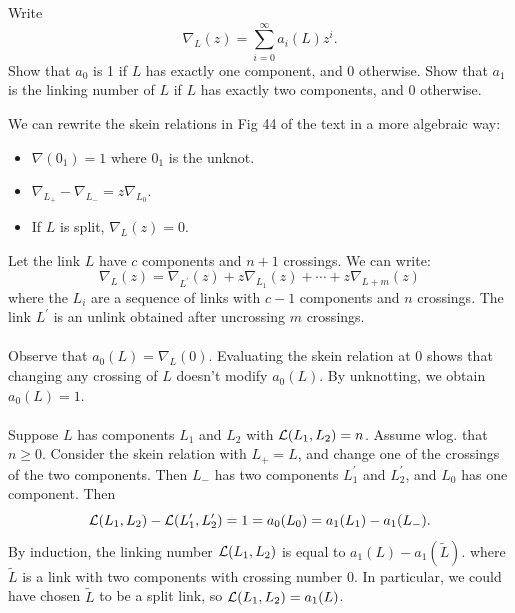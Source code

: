 \documentclass[10pt]{article}
\begin{document}
\begin{example}
	Write
	$$
	\nabla_L(z)=\sum_{i=0}^{\infty}a_i(L)z^i.
	$$
	Show that $a_0$ is 1 if $L$ has exactly one component, and 0 otherwise. Show that $a_1$ is the linking number of $L$ if $L$ has exactly two components, and 0 otherwise.
\end{example}
\sol We can rewrite the skein relations in Fig 44 of the text in a more algebraic way:
\begin{itemize}
	\item $\nabla(0_1) = 1$ where $0_1$ is the unknot.
	\item $\nabla_{L_+} - \nabla_{L_-} = z\nabla_{L_0}$.
	\item If $L$ is split, $\nabla_L(z) =0$.
\end{itemize}
Let the link $L$ have $c$ components and $n+1$ crossings. We can write:
$$
\nabla_L(z)=\nabla_{L^\prime}(z)+z\nabla_{L_1}(z)+\cdots+z\nabla_{L+m}(z)
$$
where the $L_i$ are a sequence of links with $c-1$ components and $n$ crossings. The link $L^\prime$ is an unlink obtained after uncrossing $m$ crossings.\\\\
Observe that $a_0(L)=\nabla_L(0)$. Evaluating the skein relation at 0 shows that changing any crossing of $L$ doesn't modify $a_0(L)$. By unknotting, we obtain $a_0(L)=1$.\\\\
Suppose $L$ has components $L_1$ and $L_2$ with $\mathcal{L}(L_1,L_2)=n$. Assume wlog. that $n \ge 0$. Consider the skein relation with $L_+=L$, and change one of the crossings of the two components. Then $L_-$ has two components $L_1^\prime$ and $L_2^\prime$, and $L_0$ has one component. Then
$$
\mathcal{L}(L_1,L_2)-\mathcal{L}(L_1^\prime,L_2^\prime) = 1 = a_0(L_0) = a_1(L_1) - a_1(L_-).
$$
By induction, the linking number $\mathcal{L}(L_1, L_2)$ is equal to $a_1(L)-a_1(\tilde{L})$. where $\tilde{L}$ is a link
with two components with crossing number 0. In particular, we could have chosen $\tilde{L}$ to be a split link, so $\mathcal{L}(L_1, L_2) = a_1(L)$.
\end{document}
